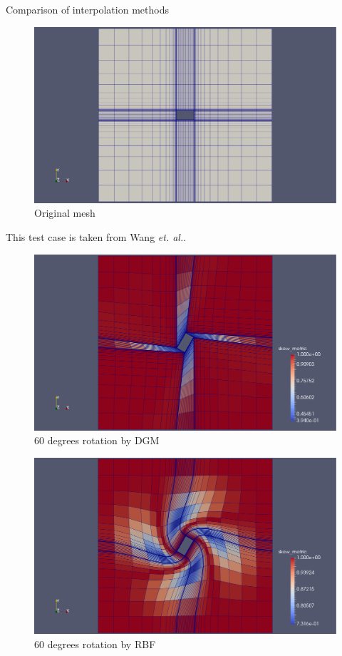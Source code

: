 \documentclass[t,12pt]{beamer}
\begin{document}
\begin{frame}{Comparison of interpolation methods}
 \begin{figure}
 	\centering
 	\includegraphics[scale=0.15]{qin-orig-mesh.pdf}
 	\caption{Original mesh}
 	\label{fig:qin-orig}
 \end{figure}
 This test case is taken from Wang \emph{et. al.}.
\end{frame}
\begin{frame}
	 \begin{figure}
	 	\centering
	 	\includegraphics[scale=0.2]{qin-60-dgm-quality.pdf}
	 	\caption{60 degrees rotation by DGM}
	 	\label{fig:qin-60-dgm}
	 \end{figure}
\end{frame}
\begin{frame}
	 \begin{figure}
	 	\centering
	 	\includegraphics[scale=0.2]{qin-60-rbf-quality.pdf}
	 	\caption{60 degrees rotation by RBF}
	 	\label{fig:qin-60-rbf}
	 \end{figure}
\end{frame}
\end{document}

